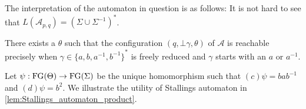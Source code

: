 The interpretation of the automaton in question is as follows:
It is not hard to see that $L(\mathcal{A}_{p, q}) = {\left(\Sigma \cup \Sigma^{-1}\right)}^\ast$.

\begin{definition}%
  \label{def:Stallings_automaton_reachable_configuration}
  \rocqok{}
  There exists a $\theta$ such that the configuration $(q, \bot\gamma, \theta)$ of $\mathcal{A}$ is reachable
  precisely when $\gamma\in {\{a, b, a^{-1}, b^{-1}\}}^\ast$ is freely reduced and $\gamma$ starts with an
  $a$ or $a^{-1}$.
\end{definition}

Let $\psi: \textrm{FG}(\Theta) \rightarrow \textrm{FG}(\Sigma)$ be the unique homomorphism such that $(c)\psi = bab^{-1}$ and
$(d)\psi = b^2$. We illustrate the utility of Stallings automaton in \cref{lem:Stallings_automaton_product}.

